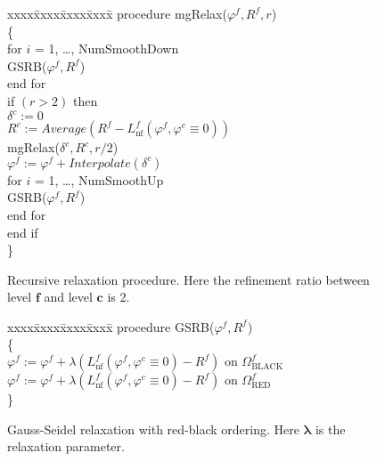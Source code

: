 \documentclass{ieee}
\numberwithin{equation}{section}
\begin{document}
\begin{figure}[thp]
{\small
\begin{tabbing} 
xxxx\=xxxx\=xxxx\=xxxx\=\kill
\>procedure mgRelax($\varphi^f, R^f, r$) \\
\>\{ \\
\>\> for $i$ = 1, \ldots, NumSmoothDown \\
\>\>\> GSRB($ \varphi^f, R^f$) \\
\>\> end for \\
\>\>if $(r > 2)$ then \\
\>\>\>$\delta^c := 0$ \\
\>\>\>$R^c := Average(R^f - L^{f}_{\text{nf}}(\varphi^f, \varphi^c \equiv 0))$ \\
\>\>\>mgRelax($\delta^c, R^c, r/2$) \\
\>\>\>$\varphi^f := \varphi^f + Interpolate(\delta^c)$ \\
\>\>\> for $i$ = 1, \ldots, NumSmoothUp \\
\>\>\>\> GSRB($ \varphi^f, R^f$) \\
\>\>\> end for \\
\>\>end if \\
\>\}
\end{tabbing}
\caption{Recursive relaxation procedure. Here the refinement ratio between level $\boldsymbol{f}$ and level $\boldsymbol{c}$ is 2.}
\label{mgRelax}
}
\end{figure}

\begin{figure}[thp]
{\small
\begin{tabbing} 
xxxx\=xxxx\=xxxx\=xxxx\=\kill
procedure GSRB($\varphi^f, R^f$) \\
\{ \\
\>$ \varphi^f := \varphi^f +
 \lambda(L^{f}_{\text{nf}} (\varphi^f, \varphi^c \equiv0) - R^f)
\mbox{ on } \Omega^{f}_{\text{BLACK}}$ \\
\>$ \varphi^f := \varphi^f +
 \lambda(L^{f}_{\text{nf}} (\varphi^f, \varphi^c \equiv 0) - R^f)
\mbox{ on } \Omega^{f}_{\text{RED}}$ \\
\}
\end{tabbing}
\caption{Gauss-Seidel relaxation with red-black ordering. Here $\boldsymbol{\lambda}$ is the relaxation parameter.}
\label{LevelGSRB}
}
\end{figure}
\end{document}
